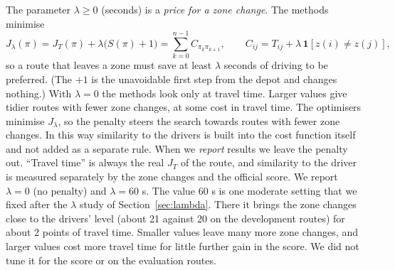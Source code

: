 \documentclass[11pt,a4paper]{article}
\newcommand{\JT}{J_T}
\newcommand{\Jl}{J_\lambda}
\begin{document}
The parameter $\lambda\ge 0$ (seconds) is a \emph{price for a zone change}. The methods minimise
\begin{equation}
\Jl(\pi)=\JT(\pi)+\lambda\bigl(S(\pi)+1\bigr)
=\sum_{k=0}^{n-1} C_{\pi_k\pi_{k+1}},\qquad C_{ij}=T_{ij}+\lambda\,\mathbf 1\!\left[z(i)\neq z(j)\right],
\end{equation}
so a route that leaves a zone must save at least $\lambda$ seconds of driving to be preferred. (The $+1$ is the unavoidable first step from the depot and changes nothing.) With $\lambda=0$ the methods look only at travel time. Larger values give tidier routes with fewer zone changes, at some cost in travel time. The optimisers minimise $\Jl$, so the penalty steers the search towards routes with fewer zone changes. In this way similarity to the drivers is built into the cost function itself and not added as a separate rule. When we \emph{report} results we leave the penalty out. ``Travel time'' is always the real $\JT$ of the route, and similarity to the driver is measured separately by the zone changes and the official score. We report $\lambda=0$ (no penalty) and $\lambda=60$ s. The value 60 s is one moderate setting that we fixed after the $\lambda$ study of Section~\ref{sec:lambda}. There it brings the zone changes close to the drivers' level (about 21 against 20 on the development routes) for about 2 points of travel time. Smaller values leave many more zone changes, and larger values cost more travel time for little further gain in the score. We did not tune it for the score or on the evaluation routes.
\end{document}
